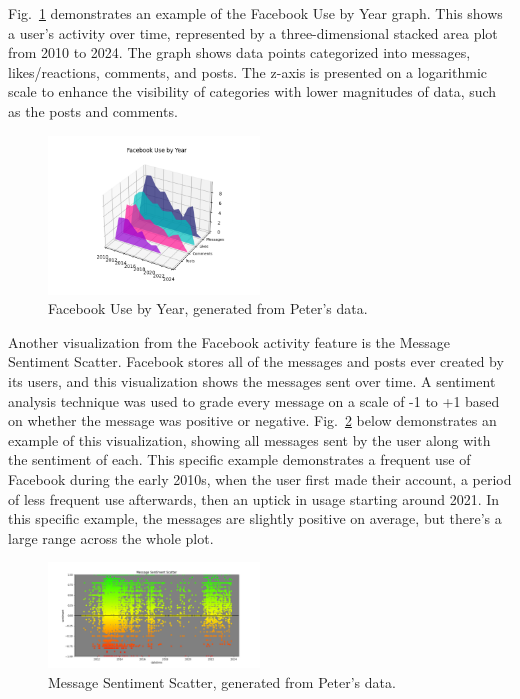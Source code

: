 \documentclass[conference, letterpaper, 11pt]{IEEEtran}
\begin{document}
Fig.~\ref{fig:fuy} demonstrates an example of the Facebook Use by Year graph. This shows a user's activity over time, represented by a three-dimensional stacked area plot from 2010 to 2024. The graph shows data points categorized into messages, likes/reactions, comments, and posts. The z-axis is presented on a logarithmic scale to enhance the visibility of categories with lower magnitudes of data, such as the posts and comments. 

\begin{figure}[htbp]
    \centering
    \includegraphics[width=0.5\textwidth]{img/fuy.png}
    \caption{Facebook Use by Year, generated from Peter's data.}
    \label{fig:fuy}
\end{figure}

Another visualization from the Facebook activity feature is the Message Sentiment Scatter. Facebook stores all of the messages and posts ever created by its users, and this visualization shows the messages sent over time. A sentiment analysis technique was used to grade every message on a scale of -1 to +1 based on whether the message was positive or negative. Fig.~\ref{fig:ssp} below demonstrates an example of this visualization, showing all messages sent by the user along with the sentiment of each. This specific example demonstrates a frequent use of Facebook during the early 2010s, when the user first made their account, a period of less frequent use afterwards, then an uptick in usage starting around 2021. In this specific example, the messages are slightly positive on average, but there's a large range across the whole plot.

\begin{figure}[htbp]
    \centering
    \includegraphics[width=0.5\textwidth]{img/mss.png}
    \caption{Message Sentiment Scatter, generated from Peter's data.}
    \label{fig:ssp}
\end{figure}
\end{document}
